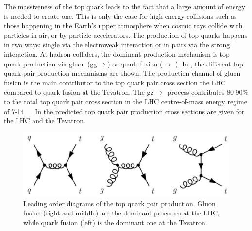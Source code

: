 The massiveness of the top quark leads to the fact that a large amount of energy is needed to create one. This is only the case for high energy collisions such as those happening in the Earth's upper atmosphere when cosmic rays collide with particles in air, or by particle accelerators. The production of top quarks happens in two ways: single via the electroweak interaction or in pairs via the strong interaction. At hadron colliders, the dominant production mechanism is top quark production via gluon (gg$\rightarrow$\ttbar) or quark fusion (\qqbar $\rightarrow$ \ttbar). In , the different top quark pair production mechanisms are shown. The production channel of gluon fusion is the main contributor to the top quark pair cross section the LHC compared to quark fusion at the Tevatron. %
The gg$\rightarrow$\ttbar\ process contributes 80-90\% to the total top quark pair cross section in the LHC centre-of-mass energy regime of 7-14~\TeV~\cite{PDG}. In  the predicted top quark pair production cross sections are given for the LHC and the Tevatron.
\begin{figure}[htbp]
	\centering
	\includegraphics[width=0.7\linewidth]{1_Introduction/Figures/toppair}
	\caption{Leading order diagrams of the top quark pair production. Gluon fusion (right and middle) are the dominant processes at the LHC, while quark fusion (left) is the dominant one at the Tevatron. }
	\label{fig:toppairproduction}
\end{figure}

